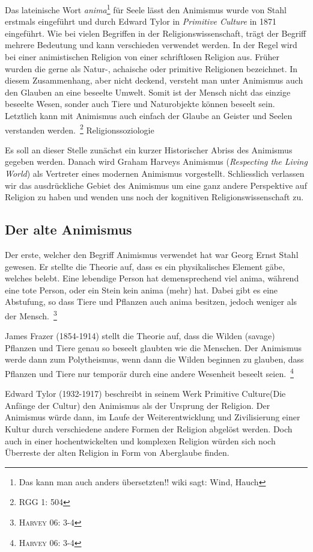 Das lateinische Wort \emph{anima}\footnote{Das kann man auch anders übersetzten!! wiki sagt: Wind, Hauch} für Seele lässt den Animismus wurde von Stahl erstmals eingeführt und durch Edward Tylor in \emph{Primitive Culture} in 1871 eingeführt. Wie bei vielen Begriffen in der Religionswissenschaft, trägt der Begriff mehrere Bedeutung und kann verschieden verwendet werden. In der Regel wird bei einer animistischen Religion von einer schriftlosen Religion aus. Früher wurden die gerne als Natur-, achaische oder primitive Religionen bezeichnet. In diesem Zusammenhang, aber nicht deckend, versteht man unter Animismus auch den Glauben an eine beseelte Umwelt. Somit ist der Mensch nicht das einzige beseelte Wesen, sonder auch Tiere und Naturobjekte können beseelt sein. Letztlich kann mit Animismus auch einfach der Glaube an Geister und Seelen verstanden werden.~\footnote{RGG 1: 504} 
Religionssoziologie

Es soll an dieser Stelle zunächst ein kurzer Historischer Abriss des Animismus gegeben werden. Danach wird Graham Harveys Animismus (\emph{Respecting the Living World}) als Vertreter eines modernen Animismus vorgestellt. Schliesslich verlassen wir das ausdrückliche Gebiet des Animismus um eine ganz andere Perspektive auf Religion zu haben und wenden uns noch der kognitiven Religionswissenschaft zu. 

\subsection{Der alte Animismus}

Der erste, welcher den Begriff Animismus verwendet hat war Georg Ernst Stahl gewesen. Er stellte die Theorie auf, dass es ein physikalisches Element gäbe, welches belebt. Eine lebendige Person hat demensprechend viel anima, während eine tote Person, oder ein Stein kein anima (mehr) hat. Dabei gibt es eine Abstufung, so dass Tiere und Pflanzen auch anima besitzen, jedoch weniger als der Mensch.~\footnote{\textsc{Harvey 06: 3-4}}

James Frazer (1854-1914) stellt die Theorie auf, dass die Wilden (savage) Pflanzen und Tiere genau so beseelt glaubten wie die Menschen. Der Animismus werde dann zum Polytheismus, wenn dann die Wilden beginnen zu glauben, dass Pflanzen und Tiere nur temporär durch eine andere Wesenheit beseelt seien.~\footnote{\textsc{Harvey 06: 3-4}} 

Edward Tylor (1932-1917) beschreibt in seinem Werk \glqq Primitive Culture\grqq (Die Anfänge der Cultur) den Animismus als der Ursprung der Religion. Der Animismus würde dann, im Laufe der Weiterentwicklung und Zivilisierung einer Kultur durch verschiedene andere Formen der Religion abgelöst werden. Doch auch in einer hochentwickelten und komplexen Religion würden sich noch Überreste der alten Religion in Form von Aberglaube finden.

